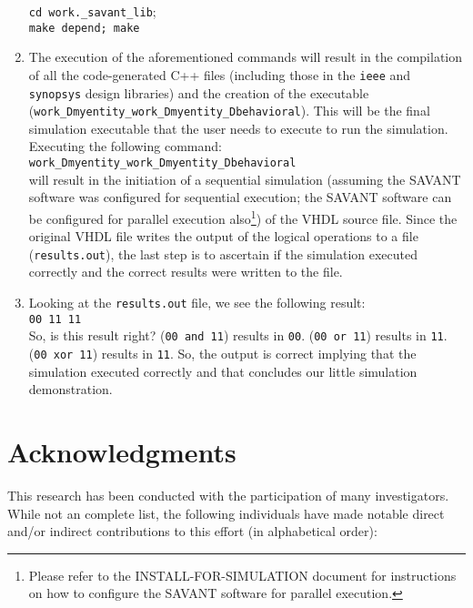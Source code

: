 \documentclass[12pt]{report}
\begin{document}
\begin{enumerate}
      \texttt{cd work.\_savant\_lib};\\
      \texttt{make depend; make}

\item The execution of the aforementioned commands will result in the
      compilation of all the code-generated C++ files (including those in
      the \texttt{ieee} and \texttt{synopsys} design libraries) and the
      creation of the executable
      (\texttt{work\_Dmyentity\_work\_Dmyentity\_Dbehavioral}). This will
      be the final simulation executable that the user needs to execute to
      run the simulation. Executing the following command:\\

      \texttt{work\_Dmyentity\_work\_Dmyentity\_Dbehavioral} \\

      will result in the initiation of a sequential simulation (assuming
      the SAVANT software was configured for sequential execution; the
      SAVANT software can be configured for parallel execution
      also\footnote{Please refer to the \textsf{INSTALL-FOR-SIMULATION}
      document for instructions on how to configure the SAVANT software
      for parallel execution.}) of the VHDL source file. Since the
      original VHDL file writes the output of the logical operations to a
      file (\texttt{results.out}), the last step is to ascertain if the
      simulation executed correctly and the correct results were written
      to the file.

\item Looking at the \texttt{results.out} file, we see the following
      result:\\

	 \texttt{00  11  11}\\

      So, is this result right? (\texttt{00 and 11}) results in
      \texttt{00}. (\texttt{00 or 11}) results in \texttt{11}.
      (\texttt{00 xor 11}) results in \texttt{11}. So, the output is
      correct implying that the simulation executed correctly and that
      concludes our little simulation demonstration.

\end{enumerate}

\section*{Acknowledgments}

This research has been conducted with the participation of many
investigators.  While not an complete list, the following individuals have
made notable direct and/or indirect contributions to this effort (in
alphabetical order):
\end{document}
